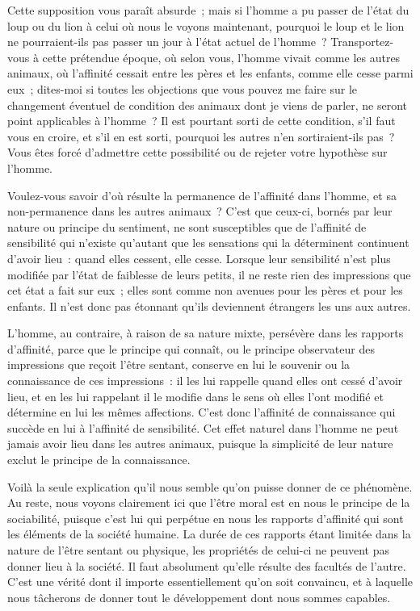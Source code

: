 \documentclass[french,twoside]{book} %
\newcommand\chapterclose{} %
\begin{document}
Cette supposition vous paraît absurde ; mais si l’homme a pu passer de l’état du loup ou du lion à celui où nous le voyons maintenant, pourquoi le loup et le lion ne pourraient-ils pas passer un jour à l’état actuel de l’homme ? Transportez-vous à cette prétendue époque, où selon vous, l’homme vivait comme les autres animaux, où l’affinité cessait entre les pères et les enfants, comme elle cesse parmi eux ; dites-moi si toutes les objections que vous pouvez me faire sur le changement éventuel de condition des animaux dont je viens de parler, ne seront point applicables à l’homme ? Il est pourtant sorti de cette condition, s’il faut vous en croire, et s’il en est sorti, pourquoi les autres n’en sortiraient-ils pas ? Vous êtes forcé d’admettre cette possibilité ou de rejeter votre hypothèse sur l’homme.\par
Voulez-vous savoir d’où résulte la permanence de l’affinité dans l’homme, et sa non-permanence dans les autres animaux ? C’est que ceux-ci, bornés par leur nature ou principe du sentiment, ne sont susceptibles que de l’affinité de sensibilité qui n’existe qu’autant que les sensations qui la déterminent continuent d’avoir lieu : quand elles cessent, elle cesse. Lorsque leur sensibilité n’est plus modifiée par l’état de faiblesse de leurs petits, il ne reste rien des impressions que cet état a fait sur eux ; elles sont comme non avenues pour les pères et pour les enfants. Il n’est donc pas étonnant qu’ils deviennent étrangers les uns aux autres.\par
L’homme, au contraire, à raison de sa nature mixte, persévère dans les rapports d’affinité, parce que le principe qui connaît, ou le principe observateur des impressions que reçoit l’être sentant, conserve en lui le souvenir ou la connaissance de ces impressions : il les lui rappelle quand elles ont cessé d’avoir lieu, et en les lui rappelant il le modifie dans le sens où elles l’ont modifié et détermine en lui les mêmes affections. C’est donc l’affinité de connaissance qui succède en lui à l’affinité de sensibilité. Cet effet naturel dans l’homme ne peut jamais avoir lieu dans les autres animaux, puisque la simplicité de leur nature exclut le principe de la connaissance.\par
Voilà la seule explication qu’il nous semble qu’on puisse donner de ce phénomène. Au reste, nous voyons clairement ici que l’être moral est en nous le principe de la sociabilité, puisque c’est lui qui perpétue en nous les rapports d’affinité qui sont les éléments de la société humaine. La durée de ces rapports étant limitée dans la nature de l’être sentant ou physique, les propriétés de celui-ci ne peuvent pas donner lieu à la société. Il faut absolument qu’elle résulte des facultés de l’autre. C’est une vérité dont il importe essentiellement qu’on soit convaincu, et à laquelle nous tâcherons de donner tout le développement dont nous sommes capables.
\chapterclose
\end{document}
